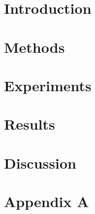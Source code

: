 \documentclass[twoside]{article}
\begin{document}
\begin{multicols}{2} %

\section{Introduction}



\section{Methods}



\section{Experiments}



\section{Results}



\section{Discussion}




{}


\section*{Appendix A}



\end{multicols}
\end{document}
